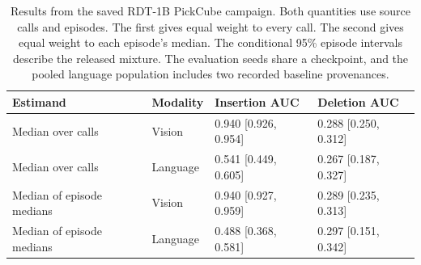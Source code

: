 \begin{table}[htbp]
\centering\small
\setlength{\tabcolsep}{3.5pt}
\caption{Results from the saved RDT-1B PickCube campaign. Both quantities use \OneBCalls{} source calls and \OneBEpisodes{} episodes. The first gives equal weight to every call. The second gives equal weight to each episode's median. The conditional 95\% episode intervals describe the released mixture. The evaluation seeds share a checkpoint, and the pooled language population includes two recorded baseline provenances.}
\label{tab:oneb}
\begin{tabular}{llll}
\toprule
Estimand & Modality & Insertion AUC & Deletion AUC \\
\midrule
Median over calls & Vision & 0.940 [0.926, 0.954] & 0.288 [0.250, 0.312] \\
Median over calls & Language & 0.541 [0.449, 0.605] & 0.267 [0.187, 0.327] \\
Median of episode medians & Vision & 0.940 [0.927, 0.959] & 0.289 [0.235, 0.313] \\
Median of episode medians & Language & 0.488 [0.368, 0.581] & 0.297 [0.151, 0.342] \\
\bottomrule
\end{tabular}
\end{table}
